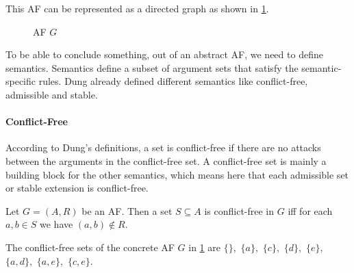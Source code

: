 This AF can be represented as a directed graph as shown in \cref{af:backgroundAFexample1}.
\begin{figure}[h]
    \centering
    \caption{\ac{AF} $G$}
    \label{af:backgroundAFexample1}
\end{figure}

To be able to conclude something, out of an abstract AF, we need to define semantics. Semantics define a subset of argument sets that satisfy the semantic-specific rules. Dung already defined different semantics \cite{Dung1995-DUNOTA-2} like conflict-free, admissible and stable.

\newpage
\paragraph{Conflict-Free} According to Dung's definitions, a set is conflict-free if there are no attacks between the arguments in the conflict-free set. A conflict-free set is mainly a building block for the other semantics, which means here that each admissible set or stable extension is conflict-free.

\begin{definition}
    Let $G=(A,R)$ be an AF. Then a set $S \subseteq A$ is conflict-free in $G$ iff for each $a, b \in S$ we have $(a, b) \not\in R$.
\end{definition}

\begin{example}
    The conflict-free sets of the concrete AF $G$ in \cref{af:backgroundAFexample1} are $\{\},$
    $\{a\},$
    $\{c\},$
    $\{d\},$
    $\{e\},$
    $\{a, d\},$
    $\{a, e\},$
    $\{c, e\}$.
\end{example}





